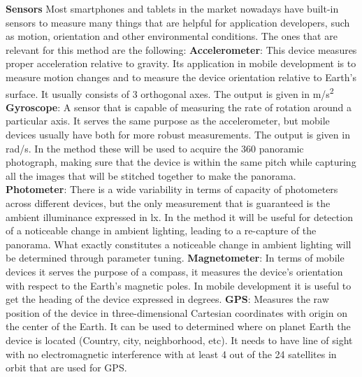 \textbf{Sensors}\newline
Most smartphones and tablets in the market nowadays have built-in sensors to measure many things that are helpful for application developers, such as motion, orientation and other environmental conditions. The ones that are relevant for this method are the following:\newline
\textbf{Accelerometer}: This device measures proper acceleration relative to gravity. Its application in mobile development is to measure motion changes and to measure the device orientation relative to Earth's surface. It usually consists of 3 orthogonal axes. The output is given in m/s\textsuperscript{2} \newline
\textbf{Gyroscope}: A sensor that is capable of measuring the rate of rotation around a particular axis. It serves the same purpose as the accelerometer, but mobile devices usually have both for more robust measurements. The output is given in rad/s. In the method these will be used to acquire the 360 panoramic photograph, making sure that the device is within the same pitch while capturing all the images that will be stitched together to make the panorama. \newline
\textbf{Photometer}: There is a wide variability in terms of capacity of photometers across different devices, but the only measurement that is guaranteed is the ambient illuminance expressed in lx.  In the method it will be useful for detection of a noticeable change in ambient lighting, leading to a re-capture of the panorama. What exactly constitutes a noticeable change in ambient lighting will be determined through parameter tuning. \newline 
\textbf{Magnetometer}: In terms of mobile devices it serves the purpose of a compass, it measures the device's orientation with respect to the Earth's magnetic poles. In mobile development it is useful to get the heading of the device expressed in degrees.\newline
\textbf{GPS}: Measures the raw position of the device in three-dimensional Cartesian coordinates with origin on the center of the Earth. It can be used to determined where on planet Earth the device is located (Country, city, neighborhood, etc). It needs to have line of sight with no electromagnetic interference with at least 4 out of the 24 satellites in orbit that are used for GPS.

